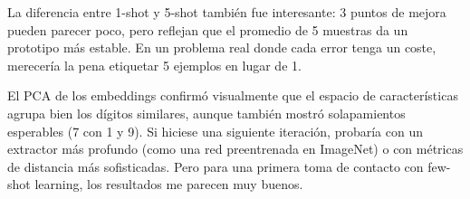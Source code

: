 \documentclass[../../__memoria.tex]{subfiles}
\begin{document}
La diferencia entre 1-shot y 5-shot también fue interesante: 3 puntos de mejora pueden parecer poco, pero reflejan que el promedio de 5 muestras da un prototipo más estable. En un problema real donde cada error tenga un coste, merecería la pena etiquetar 5 ejemplos en lugar de 1.

El PCA de los embeddings confirmó visualmente que el espacio de características agrupa bien los dígitos similares, aunque también mostró solapamientos esperables (7 con 1 y 9). Si hiciese una siguiente iteración, probaría con un extractor más profundo (como una red preentrenada en ImageNet) o con métricas de distancia más sofisticadas. Pero para una primera toma de contacto con few-shot learning, los resultados me parecen muy buenos.
\end{document}
